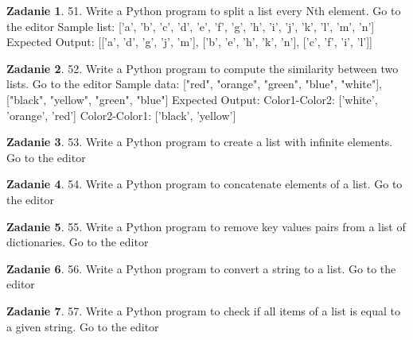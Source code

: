 \documentclass[11pt]{article}
\theoremstyle{definition}
\newtheorem{zadanie}{Zadanie}
\begin{document}
\begin{zadanie}


51. Write a Python program to split a list every Nth element. Go to the editor
Sample list: ['a', 'b', 'c', 'd', 'e', 'f', 'g', 'h', 'i', 'j', 'k', 'l', 'm', 'n']
Expected Output: [['a', 'd', 'g', 'j', 'm'], ['b', 'e', 'h', 'k', 'n'], ['c', 'f', 'i', 'l']]


\end{zadanie}

\begin{zadanie}


52. Write a Python program to compute the similarity between two lists. Go to the editor
Sample data: ["red", "orange", "green", "blue", "white"], ["black", "yellow", "green", "blue"]
Expected Output:
Color1-Color2: ['white', 'orange', 'red']
Color2-Color1: ['black', 'yellow']


\end{zadanie}

\begin{zadanie}


53. Write a Python program to create a list with infinite elements. Go to the editor


\end{zadanie}

\begin{zadanie}


54. Write a Python program to concatenate elements of a list. Go to the editor


\end{zadanie}

\begin{zadanie}


55. Write a Python program to remove key values pairs from a list of dictionaries. Go to the editor


\end{zadanie}

\begin{zadanie}


56. Write a Python program to convert a string to a list. Go to the editor


\end{zadanie}

\begin{zadanie}


57. Write a Python program to check if all items of a list is equal to a given string. Go to the editor


\end{zadanie}
\end{document}
